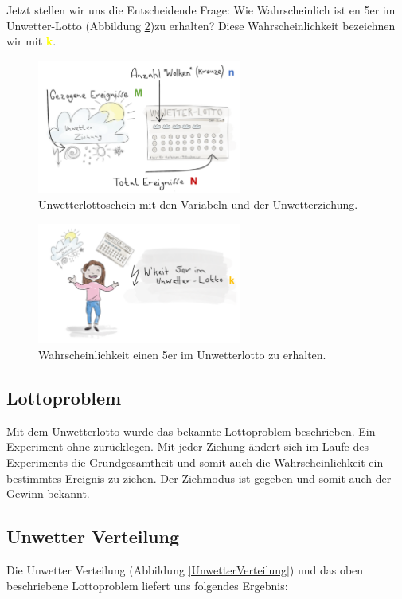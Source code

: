 \begin{refsection}
Jetzt stellen wir uns die Entscheidende Frage: Wie Wahrscheinlich ist en 5er im Unwetter-Lotto (Abbildung \ref{WahrscheinlichkeitUnwetterlotto})zu erhalten? Diese Wahrscheinlichkeit bezeichnen wir mit \textcolor{yellow}{\textbf{k}}.

\begin{figure}[htbp]
\centering
\includegraphics[width=0.6\textwidth]{extrem/Lottoscheinausgefuellt.pdf}
\caption{Unwetterlottoschein mit den Variabeln und der Unwetterziehung.}
\label{Lottoscheinausgefuellt}
\end{figure}

\begin{figure}[htbp]
\centering
\includegraphics[width=0.6\textwidth]{extrem/wkeitlotto.pdf}
\caption{Wahrscheinlichkeit einen 5er im Unwetterlotto zu erhalten.}
\label{WahrscheinlichkeitUnwetterlotto}
\end{figure}

\subsection{Lottoproblem}
Mit dem Unwetterlotto wurde das bekannte Lottoproblem beschrieben. Ein Experiment ohne zurücklegen. Mit jeder Ziehung ändert sich im Laufe des Experiments die Grundgesamtheit und somit auch die Wahrscheinlichkeit ein bestimmtes Ereignis zu ziehen. Der Ziehmodus ist gegeben und somit auch der Gewinn bekannt.


\subsection{Unwetter Verteilung}
Die Unwetter Verteilung (Abbildung \ref{UnwetterVerteilung}) und das oben beschriebene Lottoproblem liefert uns folgendes Ergebnis:



\end{refsection}
